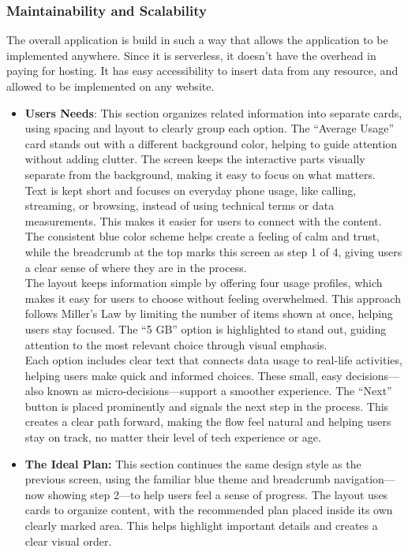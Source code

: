 \documentclass[conference]{IEEEtran}
\begin{document}
\subsubsection{Maintainability and Scalability}
The overall application is build in such a way that allows the application to be implemented anywhere. Since it is serverless, it doesn't have the overhead in paying for hosting. It has easy accessibility to insert data from any resource, and allowed to be implemented on any website.
\begin{itemize}
    \item \textbf{Users Needs}: This section organizes related information into separate cards, using spacing and layout to clearly group each option. The “Average Usage” card stands out with a different background color, helping to guide attention without adding clutter. The screen keeps the interactive parts visually separate from the background, making it easy to focus on what matters.
\\
Text is kept short and focuses on everyday phone usage, like calling, streaming, or browsing, instead of using technical terms or data measurements. This makes it easier for users to connect with the content. The consistent blue color scheme helps create a feeling of calm and trust, while the breadcrumb at the top marks this screen as step 1 of 4, giving users a clear sense of where they are in the process.
\\
The layout keeps information simple by offering four usage profiles, which makes it easy for users to choose without feeling overwhelmed. This approach follows Miller’s Law by limiting the number of items shown at once, helping users stay focused. The “5 GB” option is highlighted to stand out, guiding attention to the most relevant choice through visual emphasis.
\\
Each option includes clear text that connects data usage to real-life activities, helping users make quick and informed choices. These small, easy decisions—also known as micro-decisions—support a smoother experience. The “Next” button is placed prominently and signals the next step in the process. This creates a clear path forward, making the flow feel natural and helping users stay on track, no matter their level of tech experience or age.
\item \textbf{The Ideal Plan:} This section continues the same design style as the previous screen, using the familiar blue theme and breadcrumb navigation—now showing step 2—to help users feel a sense of progress. The layout uses cards to organize content, with the recommended plan placed inside its own clearly marked area. This helps highlight important details and creates a clear visual order.

\end{itemize}
\end{document}
